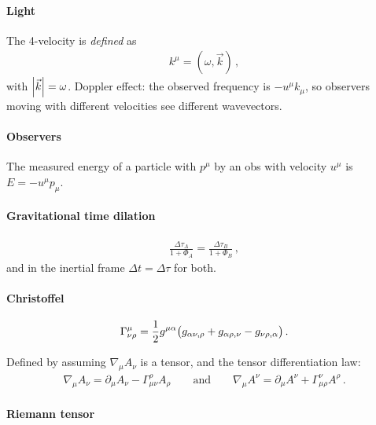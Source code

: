 \documentclass[main.tex]{subfiles}
\begin{document}
\paragraph{Light}

The 4-velocity is \emph{defined} as 
%
\begin{align}
k^{\mu } = (\omega , \vec{k})
\,,
\end{align}
%
with \(\abs{\vec{k}} = \omega \). 
Doppler effect: the observed frequency is \(-u^{\mu } k_{\mu }\), so observers moving with different velocities see different wavevectors.

\paragraph{Observers}

The measured energy of a particle with \(p^{\mu }\) by an obs with velocity \(u^{\mu }\) is \(E = - u^{\mu } p_{\mu }\). 

\paragraph{Gravitational time dilation}

\begin{align}
\frac{\Delta \tau _A}{ 1 + \Phi_{A}}
=\frac{\Delta \tau _B}{ 1 + \Phi_{B}}
\,,
\end{align}
%
and in the inertial frame \(\Delta t = \Delta \tau \) for both.

\paragraph{Christoffel}

\begin{align}
\Gamma^{\mu }_{\nu \rho } = \frac{1}{2} g^{\mu \alpha }
\qty(g_{\alpha \nu , \rho } + g_{\alpha \rho , \nu } - g_{\nu \rho , \alpha })
\,.
\end{align}

Defined by assuming \(\nabla_{\mu } A_{\nu }\) is a tensor, and the tensor differentiation law: 
%
\begin{align}
\nabla_{\mu } A_{\nu } = 
\partial_{\mu } A_{\nu } 
- \Gamma^{\rho }_{\mu \nu } A_{\rho }
\qquad \text{and} \qquad
\nabla_{\mu } A^{\nu } =
\partial_{\mu } A^{ \nu } 
+ \Gamma^{\nu }_{\mu \rho } A^{\rho }
\,.
\end{align}

\paragraph{Riemann tensor}
\end{document}
